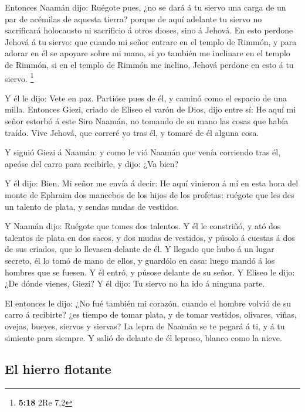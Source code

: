  Entonces Naamán dijo: Ruégote pues, ¿no se dará á tu
siervo una carga de un par de acémilas de aquesta tierra? porque de aquí
adelante tu siervo no sacrificará holocausto ni sacrificio á otros
dioses, sino á Jehová.  En esto perdone Jehová á tu siervo:
que cuando mi señor entrare en el templo de Rimmón, y para adorar en él
se apoyare sobre mi mano, si yo también me inclinare en el templo de
Rimmón, si en el templo de Rimmón me inclino, Jehová perdone en esto á
tu siervo. \footnote{\textbf{5:18} 2Re 7,2}

 Y él le dijo: Vete en paz. Partióse pues de él, y caminó
como el espacio de una milla.  Entonces Giezi, criado de
Eliseo el varón de Dios, dijo entre sí: He aquí mi señor estorbó á este
Siro Naamán, no tomando de su mano las cosas que había traído. Vive
Jehová, que correré yo tras él, y tomaré de él alguna cosa.

 Y siguió Giezi á Naamán: y como le vió Naamán que venía
corriendo tras él, apeóse del carro para recibirle, y dijo: ¿Va bien?

 Y él dijo: Bien. Mi señor me envía á decir: He aquí
vinieron á mí en esta hora del monte de Ephraim dos mancebos de los
hijos de los profetas: ruégote que les des un talento de plata, y sendas
mudas de vestidos.

 Y Naamán dijo: Ruégote que tomes dos talentos. Y él le
constriñó, y ató dos talentos de plata en dos sacos, y dos mudas de
vestidos, y púsolo á cuestas á dos de sus criados, que lo llevasen
delante de él.  Y llegado que hubo á un lugar secreto, él
lo tomó de mano de ellos, y guardólo en casa: luego mandó á los hombres
que se fuesen.  Y él entró, y púsose delante de su señor. Y
Eliseo le dijo: ¿De dónde vienes, Giezi? Y él dijo: Tu siervo no ha ido
á ninguna parte.

 El entonces le dijo: ¿No fué también mi corazón, cuando el
hombre volvió de su carro á recibirte? ¿es tiempo de tomar plata, y de
tomar vestidos, olivares, viñas, ovejas, bueyes, siervos y siervas?
 La lepra de Naamán se te pegará á ti, y á tu simiente para
siempre. Y salió de delante de él leproso, blanco como la nieve.

\hypertarget{el-hierro-flotante}{%
\subsection{El hierro flotante}\label{el-hierro-flotante}}

